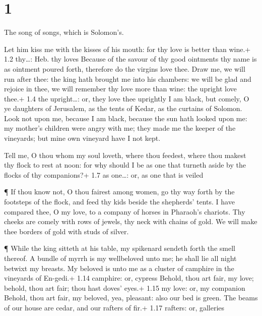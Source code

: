\hypertarget{section}{%
\section{1}\label{section}}

 The song of songs, which is Solomon's.

 Let him kiss me with the kisses of his mouth: for thy love
is better than wine.+ 1.2 thy\ldots: Heb. thy loves  Because
of the savour of thy good ointments thy name is as ointment poured
forth, therefore do the virgins love thee.  Draw me, we will
run after thee: the king hath brought me into his chambers: we will be
glad and rejoice in thee, we will remember thy love more than wine: the
upright love thee.+ 1.4 the upright\ldots: or, they love thee uprightly
 I am black, but comely, O ye daughters of Jerusalem, as the
tents of Kedar, as the curtains of Solomon.  Look not upon
me, because I am black, because the sun hath looked upon me: my mother's
children were angry with me; they made me the keeper of the vineyards;
but mine own vineyard have I not kept.

 Tell me, O thou whom my soul loveth, where thou feedest,
where thou makest thy flock to rest at noon: for why should I be as one
that turneth aside by the flocks of thy companions?+ 1.7 as one\ldots:
or, as one that is veiled

 ¶ If thou know not, O thou fairest among women, go thy way
forth by the footsteps of the flock, and feed thy kids beside the
shepherds' tents.  I have compared thee, O my love, to a
company of horses in Pharaoh's chariots.  Thy cheeks are
comely with rows of jewels, thy neck with chains of gold. 
We will make thee borders of gold with studs of silver.

 ¶ While the king sitteth at his table, my spikenard
sendeth forth the smell thereof.  A bundle of myrrh is my
wellbeloved unto me; he shall lie all night betwixt my breasts.
 My beloved is unto me as a cluster of camphire in the
vineyards of En-gedi.+ 1.14 camphire: or, cypress  Behold,
thou art fair, my love; behold, thou art fair; thou hast doves' eyes.+
1.15 my love: or, my companion  Behold, thou art fair, my
beloved, yea, pleasant: also our bed is green.  The beams
of our house are cedar, and our rafters of fir.+ 1.17 rafters: or,
galleries

